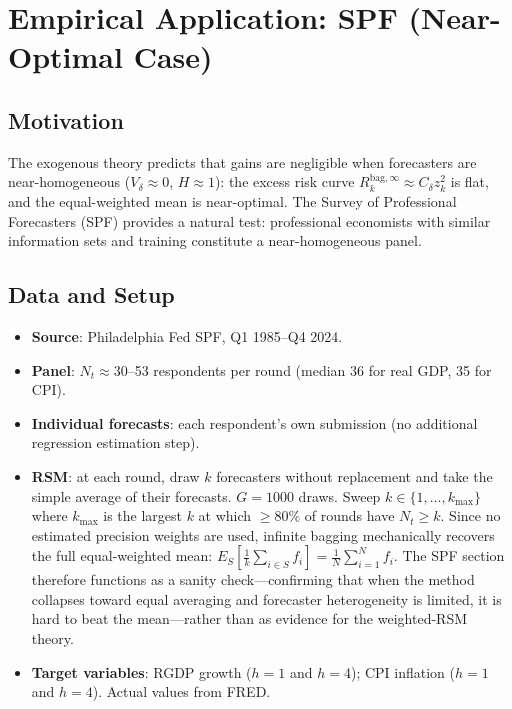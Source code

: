 \documentclass[12pt,a4paper]{article}
\theoremstyle{definition}
\begin{document}
\section{Empirical Application: SPF (Near-Optimal Case)}
\label{sec:spf}

\subsection{Motivation}

The exogenous theory predicts that gains are negligible when forecasters are
near-homogeneous ($V_\delta\approx0$, $H\approx 1$): the excess risk curve
$R_k^{\mathrm{bag},\infty}\approx C_\delta z_k^2$ is flat, and the equal-weighted
mean is near-optimal. The Survey of Professional Forecasters (SPF) provides a
natural test: professional economists with similar information sets and training
constitute a near-homogeneous panel.

\subsection{Data and Setup}

\begin{itemize}[nosep]
\item \textbf{Source}: Philadelphia Fed SPF, Q1 1985--Q4 2024.
\item \textbf{Panel}: $N_t\approx30$--53 respondents per round (median 36 for
  real GDP, 35 for CPI).
\item \textbf{Individual forecasts}: each respondent's own submission
  (no additional regression estimation step).
\item \textbf{RSM}: at each round, draw $k$ forecasters without replacement
  and take the simple average of their forecasts. $G=1000$ draws. Sweep
  $k\in\{1,\ldots,k_{\max}\}$ where $k_{\max}$ is the largest $k$ at which
  $\geq80\%$ of rounds have $N_t\geq k$.
  Since no estimated precision weights are used, infinite bagging mechanically
  recovers the full equal-weighted mean:
  $E_S\!\left[\tfrac{1}{k}\sum_{i\in S}f_i\right]=\tfrac{1}{N}\sum_{i=1}^N f_i$.
  The SPF section therefore functions as a sanity check---confirming that when
  the method collapses toward equal averaging and forecaster heterogeneity is
  limited, it is hard to beat the mean---rather than as evidence for the
  weighted-RSM theory.
\item \textbf{Target variables}: RGDP growth ($h=1$ and $h=4$); CPI inflation
  ($h=1$ and $h=4$). Actual values from FRED.
\end{itemize}
\end{document}

